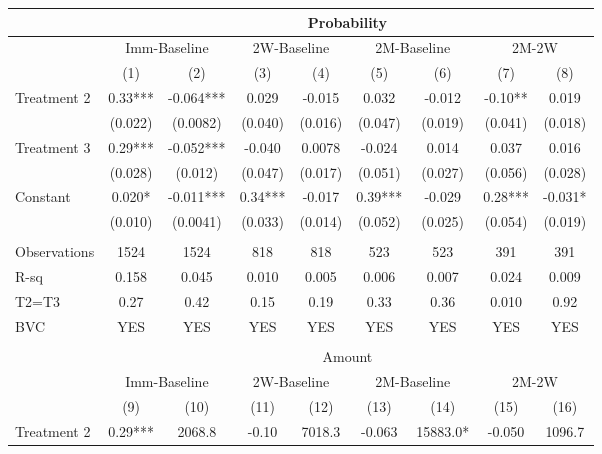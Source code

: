 \begin{tabular}{lcccccccc}
\toprule
      & \multicolumn{8}{c|}{Probability} \\
\midrule
\midrule
      & \multicolumn{2}{c}{Imm-Baseline} & \multicolumn{2}{c}{2W-Baseline} & \multicolumn{2}{c}{2M-Baseline} & \multicolumn{2}{c|}{2M-2W} \\
\midrule
      & (1)   & (2)   & (3)   & (4)   & (5)   & (6)   & (7)   & \multicolumn{1}{c|}{(8)} \\
\midrule
\midrule
Treatment 2 & 0.33*** & -0.064*** & 0.029 & -0.015 & 0.032 & -0.012 & -0.10** & 0.019 \\
      & (0.022) & (0.0082) & (0.040) & (0.016) & (0.047) & (0.019) & (0.041) & (0.018) \\
Treatment 3 & 0.29*** & -0.052*** & -0.040 & 0.0078 & -0.024 & 0.014 & 0.037 & 0.016 \\
      & (0.028) & (0.012) & (0.047) & (0.017) & (0.051) & (0.027) & (0.056) & (0.028) \\
Constant  & 0.020* & -0.011*** & 0.34*** & -0.017 & 0.39*** & -0.029 & 0.28*** & -0.031* \\
      & (0.010) & (0.0041) & (0.033) & (0.014) & (0.052) & (0.025) & (0.054) & (0.019) \\
      &       &       &       &       &       &       &       &  \\
\midrule
Observations & 1524  & 1524  & 818   & 818   & 523   & 523   & 391   & 391 \\
R-sq  & 0.158 & 0.045 & 0.010 & 0.005 & 0.006 & 0.007 & 0.024 & 0.009 \\
T2=T3 & 0.27  & 0.42  & 0.15  & 0.19  & 0.33  & 0.36  & 0.010 & 0.92 \\
BVC   & YES   & YES   & YES   & YES   & YES   & YES   & YES   & YES \\
\midrule
\midrule
      &       &       &       &       &       &       &       &  \\
\midrule
      & \multicolumn{8}{c}{Amount} \\
\midrule
\midrule
      & \multicolumn{2}{c}{Imm-Baseline} & \multicolumn{2}{c}{2W-Baseline} & \multicolumn{2}{c}{2M-Baseline} & \multicolumn{2}{c}{2M-2W} \\
\midrule
      & (9)   & (10)  & (11)  & (12)  & (13)  & (14)  & (15)  & (16) \\
\midrule
\midrule
Treatment 2 & 0.29*** & 2068.8 & -0.10 & 7018.3 & -0.063 & 15883.0* & -0.050 & 1096.7 \\

\end{tabular}

